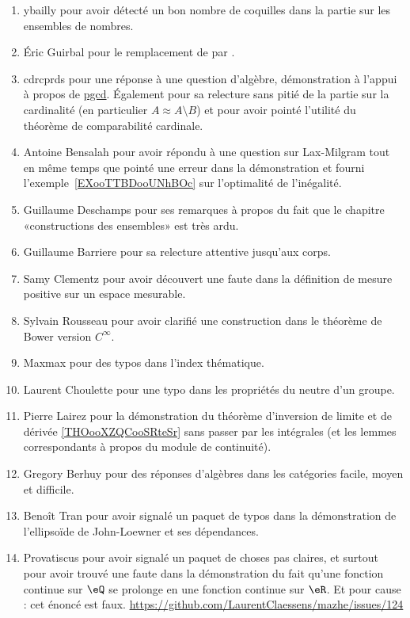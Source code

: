 \begin{enumerate}
	\item
	      ybailly pour avoir détecté un bon nombre de coquilles dans la partie sur les ensembles de nombres.
	\item
	      Éric Guirbal pour le remplacement de  par .
	\item
	      cdrcprds pour une réponse à une question d'algèbre, démonstration à l'appui à propos de \href{https://github.com/LaurentClaessens/mazhe/issues/52#issuecomment-333251728}{pgcd}. Également pour sa relecture sans pitié de la partie sur la cardinalité (en particulier \( A\approx A\setminus B\)) et pour avoir pointé l'utilité du théorème de comparabilité cardinale.
	\item
	      Antoine Bensalah pour avoir répondu à une question sur Lax-Milgram tout en même temps que pointé une erreur dans la démonstration et fourni l'exemple~\ref{EXooTTBDooUNhBOc} sur l'optimalité de l'inégalité.
	\item
	      Guillaume Deschamps pour ses remarques à propos du fait que le chapitre «constructions des ensembles» est très ardu.
	\item
	      Guillaume Barriere pour sa relecture attentive jusqu'aux corps.
	\item
	      Samy Clementz pour avoir découvert une faute dans la définition de mesure positive sur un espace mesurable.
	\item
	      Sylvain Rousseau pour avoir clarifié une construction dans le théorème de Bower version \(  C^{\infty}\).
	\item
	      Maxmax pour des typos dans l'index thématique.
	\item
	      Laurent Choulette pour une typo dans les propriétés du neutre d'un groupe.
	\item
	      Pierre Lairez pour la démonstration du théorème d'inversion de limite et de dérivée \ref{THOooXZQCooSRteSr} sans passer par les intégrales (et les lemmes correspondants à propos du module de continuité).
	\item
	      Gregory Berhuy pour des réponses d'algèbres dans les catégories facile, moyen et difficile.
	\item
	      Benoît Tran pour avoir signalé un paquet de typos dans la démonstration de l'ellipsoïde de John-Loewner et ses dépendances.
	\item
	      Provatiscus pour avoir signalé un paquet de choses pas claires, et surtout pour avoir trouvé une faute dans la démonstration du fait qu'une fonction continue sur \( \eQ\) se prolonge en une fonction continue sur \( \eR\). Et pour cause : cet énoncé est faux. \url{https://github.com/LaurentClaessens/mazhe/issues/124}

\end{enumerate}
